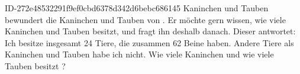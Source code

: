 \begin{exercise}
      {ID-272e48532291f9ef0cbd6378d342d6bebc686145}
      {Kaninchen und Tauben}
  \ifproblem\problem
    \xya{} bewundert die Kaninchen und Tauben von \xyb. Er möchte gern wissen,
    wie viele Kaninchen und Tauben \xyb{} besitzt, und fragt ihn deshalb danach.
    Dieser antwortet: \glqq{}Ich besitze insgesamt 24 Tiere, die zusammen 62 Beine
    haben. Andere Tiere als Kaninchen und Tauben habe ich nicht.\grqq{}
    Wie viele Kaninchen und wie viele Tauben besitzt \xyb?
  \fi
\end{exercise}
